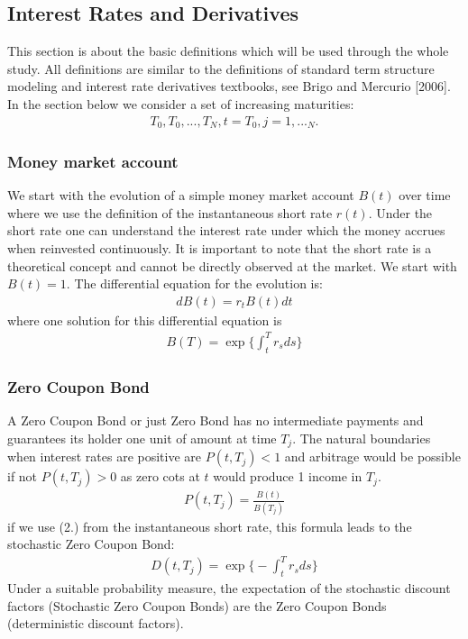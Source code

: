 \documentclass[11pt]{article}
\numberwithin{equation}{subsection}
\begin{document}
\subsection{Interest Rates and Derivatives}
This section is about the basic definitions which will be used through the whole study. All definitions are similar to the definitions of standard term structure modeling and interest rate derivatives textbooks, see Brigo and Mercurio [2006].\\
In the section below we consider a set of increasing maturities:
\begin{eqnarray}
T_0, T_0,...,T_N, t=T_0, j=1,..._N.
\end{eqnarray}
\subsubsection{Money market account}
We start with the evolution of a simple money market account \(B(t)\) over time where we use the definition of the instantaneous short rate \(r(t)\). Under the short rate one can understand the interest rate under which the money accrues when reinvested continuously. It is important to note that the short rate is a theoretical concept and cannot be directly observed at the market.	
We start with \(B(t)=1\). The differential equation for the evolution is:
\begin{eqnarray}
	dB(t) = r_{t}B(t)dt
\end{eqnarray}	
where one solution for this differential equation is
\begin{eqnarray}
B(T) = \exp\bigg\{\int_{t}^{T}r_s ds\bigg\}
\end{eqnarray}
%	
\subsubsection{Zero Coupon Bond}
A Zero Coupon Bond or just Zero Bond has no intermediate payments and guarantees its holder one unit of amount at time \(T_j\). The natural boundaries when interest rates are positive are \(P(t, T_j)<1\) and arbitrage would be possible if not \(P(t, T_j)>0\) as zero cots at \(t\) would produce 1 income in \(T_j\).
\begin{eqnarray}
	P(t, T_j) =  \frac{B(t)}{B(T_j)}
\end{eqnarray}	
if we use (2.) from the instantaneous short rate, this formula leads to the stochastic Zero Coupon Bond:
\begin{eqnarray}
D(t, T_j) = \exp\bigg\{-\int_{t}^{T}r_s ds\bigg\}
\end{eqnarray}	
Under a suitable probability measure, the expectation of the stochastic discount factors (Stochastic Zero Coupon Bonds) are the Zero Coupon Bonds (deterministic discount factors).
\end{document}
